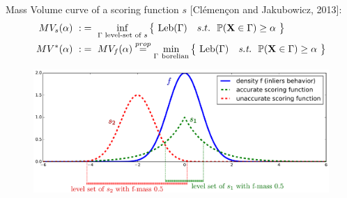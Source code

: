 \documentclass[9pt]{beamer}
\newcommand{\st}{\text{\emph{s.t.}}{}}
\newcommand\blue{\color{blue} }
\def\mb{\mathbf}
\def\leb{\text{Leb}}
\begin{document}
\begin{frame}
{\blue Mass Volume curve} of a scoring function $s$ {\small [Clémençon and Jakubowicz, 2013]}:
\begin{align*}
MV_s(\alpha) ~:&=~ \inf_{\Gamma \text{ level-set of } s} \big\{~ \leb(\Gamma) ~~~s.t.~~ \mathbb{P}(\mb X \in \Gamma) \ge \alpha~\big\} \\
MV^*(\alpha) ~:&=~ MV_f(\alpha) \overset{prop}{=}  \min_{\Gamma~ \text{borelian}} \big\{~\leb(\Gamma) ~~~\st~~ \mathbb{P}(\mb X \in \Gamma) \ge \alpha ~\big\} 
\end{align*}
%
\begin{figure}[htb]
\centering
\includegraphics[width=0.87\columnwidth]{sourcefigs/scoring2.pdf}
\end{figure}

\end{frame}






\end{document}
